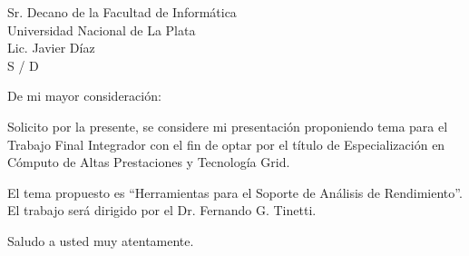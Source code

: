 \documentclass[a4paper]{letter}
\date{C\'ordoba, Diciembre del 2012}
\begin{document}
\begin{letter}{Sr. Decano de la Facultad de Inform\'atica\\
Universidad Nacional de La Plata\\
Lic. Javier D\'iaz\\
S / D}

\opening{De mi mayor consideraci\'on:}

Solicito por la presente, se considere mi presentaci\'on proponiendo tema para
el Trabajo Final Integrador con el fin de optar por el t\'itulo de
 Especializaci\'on en C\'omputo de Altas Prestaciones y Tecnolog\'ia Grid.

El tema propuesto es ``Herramientas para el Soporte de An\'alisis de
 Rendimiento''. El trabajo ser\'a dirigido por el Dr. Fernando G. Tinetti.

\closing{Saludo a usted muy atentamente.}

\end{letter}
\end{document}
